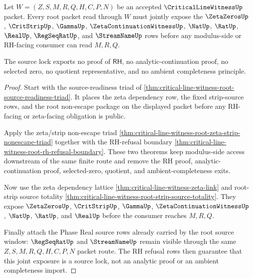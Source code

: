 \begin{theorem}
\label{thm:critical-line-witness-root-zeta-strip-source-lock}
Let $W=(Z,S,M,R,Q,H,C,P,N)$ be an accepted $\CriticalLineWitnessUp$ packet.
Every root packet read through $W$ must jointly expose the $\ZetaZerosUp$,
$\CritStripUp$, $\GammaUp$, $\ZetaContinuationWitnessUp$, $\NatUp$, $\RatUp$,
$\RealUp$, $\RegSeqRatUp$, and $\StreamNameUp$ rows before any modulus-side
or RH-facing consumer can read $M,R,Q$.

The source lock exports no proof of $\mathsf{RH}$, no analytic-continuation
proof, no selected zero, no quotient representative, and no ambient
completeness principle.
\end{theorem}
\begin{proof}
Start with the source-readiness triad of
\autoref{thm:critical-line-witness-root-source-readiness-triad}. It places
the zeta dependency row, the fixed strip-source rows, and the root
non-escape package on the displayed packet before any RH-facing or
zeta-facing obligation is public.

Apply the zeta/strip non-escape triad
\autoref{thm:critical-line-witness-root-zeta-strip-nonescape-triad} together
with the RH-refusal boundary
\autoref{thm:critical-line-witness-root-rh-refusal-boundary}. These two
theorems keep modulus-side access downstream of the same finite route and
remove the RH proof, analytic-continuation proof, selected-zero, quotient,
and ambient-completeness exits.

Now use the zeta dependency lattice
\autoref{thm:critical-line-witness-zeta-link} and root-strip source totality
\autoref{thm:critical-line-witness-root-strip-source-totality}. They expose
$\ZetaZerosUp$, $\CritStripUp$, $\GammaUp$,
$\ZetaContinuationWitnessUp$, $\NatUp$, $\RatUp$, and $\RealUp$ before the
consumer reaches $M,R,Q$.

Finally attach the Phase Real source rows already carried by the root
source window: $\RegSeqRatUp$ and $\StreamNameUp$ remain visible through the
same $Z,S,M,R,Q,H,C,P,N$ packet route. The RH refusal rows then guarantee
that this joint exposure is a source lock, not an analytic proof or an
ambient completeness import.
\end{proof}
